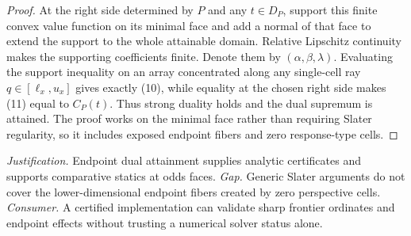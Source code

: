 \documentclass{article}
\begin{document}
\begin{proof}
At the right side determined by \(P\) and any \(t\in D_P\), support this finite convex value function on its minimal face and add a normal of that face to extend the support to the whole attainable domain. Relative Lipschitz continuity makes the supporting coefficients finite. Denote them by \((\alpha,\beta,\lambda)\). Evaluating the support inequality on an array concentrated along any single-cell ray \(q\in[\ell_x,u_x]\) gives exactly (10), while equality at the chosen right side makes (11) equal to \(C_P(t)\). Thus strong duality holds and the dual supremum is attained. The proof works on the minimal face rather than requiring Slater regularity, so it includes exposed endpoint fibers and zero response-type cells.
\end{proof}
\par\smallskip\noindent \textit{Justification.} Endpoint dual attainment supplies analytic certificates and supports comparative statics at odds faces. \textit{Gap.} Generic Slater arguments do not cover the lower-dimensional endpoint fibers created by zero perspective cells. \textit{Consumer.} A certified implementation can validate sharp frontier ordinates and endpoint effects without trusting a numerical solver status alone.
\end{document}
